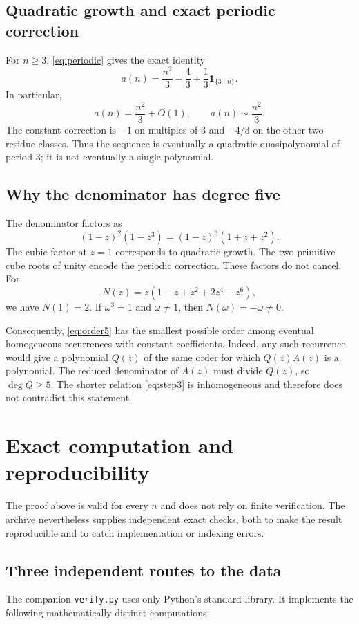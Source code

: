 \documentclass[11pt,letterpaper]{article}
\numberwithin{equation}{section}
\theoremstyle{definition}
\theoremstyle{remark}
\newcommand{\GF}{A(z)}
\begin{document}
\subsection{Quadratic growth and exact periodic correction}
For $n\ge3$, \eqref{eq:periodic} gives the exact identity
\begin{equation}\label{eq:asymptotic}
 a(n)=\frac{n^2}{3}-\frac43+\frac13\mathbf1_{\{3\mid n\}}.
\end{equation}
In particular,
\[
 a(n)=\frac{n^2}{3}+O(1),\qquad a(n)\sim\frac{n^2}{3}.
\]
The constant correction is $-1$ on multiples of $3$ and $-4/3$
on the other two residue classes. Thus the sequence is eventually
a quadratic quasipolynomial of period $3$; it is not eventually a
single polynomial.

\subsection{Why the denominator has degree five}
The denominator factors as
\[
 (1-z)^2(1-z^3)=(1-z)^3(1+z+z^2).
\]
The cubic factor at $z=1$ corresponds to quadratic growth. The two
primitive cube roots of unity encode the periodic correction.
These factors do not cancel. For
\[
 N(z)=z(1-z+z^2+2z^4-z^6),
\]
we have $N(1)=2$. If $\omega^3=1$ and $\omega\ne1$, then
$N(\omega)=-\omega\ne0$.

Consequently, \eqref{eq:order5} has the smallest possible order among
eventual homogeneous recurrences with constant coefficients.
Indeed, any such recurrence would give a polynomial $Q(z)$ of the
same order for which $Q(z)\GF$ is a polynomial. The reduced
denominator of $\GF$ must divide $Q(z)$, so $\deg Q\ge5$.
The shorter relation \eqref{eq:step3} is inhomogeneous and therefore
does not contradict this statement.

\section{Exact computation and reproducibility}
\label{sec:verification}
The proof above is valid for every $n$ and does not rely on finite
verification. The archive nevertheless supplies independent exact
checks, both to make the result reproducible and to catch implementation
or indexing errors.

\subsection{Three independent routes to the data}
The companion \texttt{verify.py} uses only Python's standard library.
It implements the following mathematically distinct computations.
\end{document}
